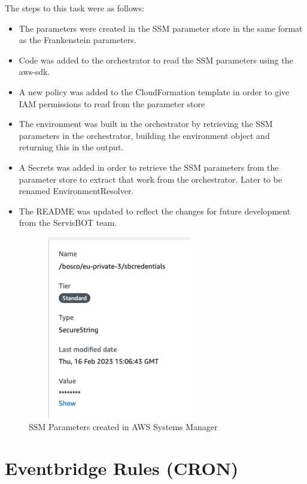 \documentclass[12pt,a4paper,titlepage]{report}
\begin{document}
The steps to this task were as follows:
\begin{itemize}
\item The parameters were created in the SSM parameter store in the same format as the Frankenstein parameters.
\item Code was added to the orchestrator to read the SSM parameters using the \ac{aws-sdk}.
\item A new policy was added to the  CloudFormation template in order to give \ac{IAM} permissions to read from the parameter store
\item The environment was built in the orchestrator by retrieving the SSM parameters in the orchestrator, building the environment object and returning this in the output.
\item A Secrets was added in order to retrieve the SSM parameters from the parameter store to extract that work from the orchestrator. Later to be renamed EnvironmentResolver. 
\item The README was updated to reflect the changes for future development from the ServisBOT team.
\end{itemize}

\begin{figure}[H]
 \centering
 \includegraphics[width=8cm,height=8cm,keepaspectratio]{./diagrams/ssm_params.png}
 \caption{SSM Parameters created in AWS Systems Manager}
\end{figure}

\section{Eventbridge Rules (CRON) }
\end{document}
